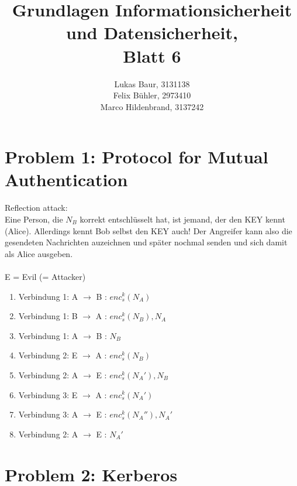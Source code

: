 \documentclass[12pt,pdftex,a4paper]{article}
\title{ Grundlagen Informationsicherheit und Datensicherheit,\\ Blatt 6}
\author{Lukas Baur, 3131138\\
	Felix Bühler, 2973410\\
	Marco Hildenbrand, 3137242}
\newcommand\tab[1][1cm]{\hspace*{#1}}
\begin{document}
\maketitle
\section*{Problem 1: Protocol for Mutual Authentication}
Reflection attack:\\
Eine Person, die $ N_B $ korrekt entschlüsselt hat, ist jemand, der den KEY kennt (Alice). Allerdings kennt Bob selbst den KEY auch! Der Angreifer kann also die gesendeten Nachrichten auzeichnen und später nochmal senden und sich damit als Alice ausgeben.
\\~\\
E = Evil (= Attacker)
\begin{enumerate}
	\item Verbindung 1: A $ \rightarrow $ B \tab : $ enc_s^k(N_A) $
	\item Verbindung 1: B $ \rightarrow $ A \tab : $ enc_s^k(N_B), N_A $
	\item Verbindung 1: A $ \rightarrow $ B \tab : $ N_B $
	\setlength{\itemsep}{20pt}
	\item Verbindung 2: E $ \rightarrow $ A \tab : $ enc_s^k(N_B) $
	\setlength{\itemsep}{5pt}
	\item Verbindung 2: A $ \rightarrow $ E \tab : $ enc_s^k(N_A'), N_B $
	\item Verbindung 3: E $ \rightarrow $ A \tab : $ enc_s^k(N_A') $
	\item Verbindung 3: A $ \rightarrow $ E \tab : $ enc_s^k(N_A''), N_A' $
	\item Verbindung 2: A $ \rightarrow $ E \tab : $ N_A' $
\end{enumerate}

\section*{Problem 2: Kerberos}
\end{document}
